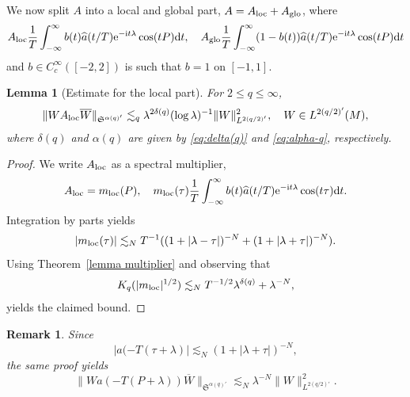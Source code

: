 \documentclass[12pt,reqno,a4paper]{amsart}
\let\coloneq\relax
\newcommand{\coloneq}{\coloneqq}
\newcommand{\rd}{{\rm d}}
\newcommand{\e}{{\rm e}}
\newcommand\I{\mathrm{i}}
\newtheorem{lemma}[theorem]{Lemma}
\newtheorem{remark}[theorem]{Remark}
\begin{document}
  We now split $A$ into a local and global part, $A=A_{\rm loc}+A_{\rm glo}$, where
  \begin{align}
    A_{\rm loc}\coloneq\frac{1}{T}\int_{-\infty}^{\infty}b(t)\widehat{a}(t/T)\e^{-\I t\lambda}\cos(tP) \rd t,\quad
    A_{\rm glo}\coloneq\frac{1}{T}\int_{-\infty}^{\infty}(1-b(t))\widehat{a}(t/T)\e^{-\I t\lambda}\cos(tP) \rd t 
  \end{align}
  and $b\in C_c^{\infty}([-2,2])$ is such that \(b=1\) on \([-1,1]\).

\begin{lemma}[Estimate for the local part]
For $2\leq q\leq\infty$,
  \begin{align}\label{eq:Aloc at q}
    \|WA_{\rm loc}\overline{W}\|_{\mathfrak{S}^{\alpha(q)'}}\lesssim_q \lambda^{2\delta(q)}(\log\lambda)^{-1}\|W\|^2_{L^{2(q/2)'}} ,\quad W\in L^{2(q/2)'}(M),
  \end{align}
  where $\delta(q)$ and $\alpha(q)$ are given by \eqref{eq:delta(q)} and \eqref{eq:alpha-q}, respectively.
\end{lemma}

\begin{proof}
We write $A_{\rm loc}$ as a spectral multiplier,
\begin{align}
    A_{\rm loc}=m_{\rm loc}(P),\quad m_{\rm loc}(\tau)\coloneq  \frac{1}{T}\int_{-\infty}^{\infty}b(t)\widehat{a}(t/T)\e^{-\I t\lambda}\cos(t\tau) \rd t.
  \end{align}
  Integration by parts yields
  \begin{align}\label{eq:bound mloc}
    |m_{\rm loc}(\tau)|\lesssim_N T^{-1}((1+|\lambda-\tau|)^{-N}+(1+|\lambda+\tau|)^{-N}) .
  \end{align}
  Using Theorem~\ref{lemma multiplier} and observing that
  \begin{align}
    K_q(|m_{\rm loc}|^{1/2})
    \lesssim_N  T^{-1/2}\lambda^{\delta(q)}+\lambda^{-N} ,
  \end{align}
  yields the claimed bound.
\end{proof}  

\begin{remark}\label{rem:smoothing operator}
Since 
\[
|a(-T(\tau+\lambda)|\lesssim_N (1+|\lambda+\tau|)^{-N},
\]
the same proof yields
\[
\|W a(-T(P+\lambda)) \overline W\|_{\mathfrak S^{\alpha(q)'}}
\lesssim_N \lambda^{-N}\|W\|^2_{L^{2(q/2)'}}.
\]
\end{remark}
\end{document}
